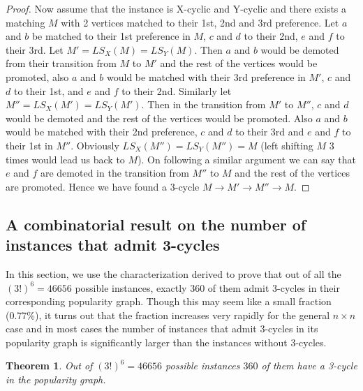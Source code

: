 \documentclass[a4paper,10pt]{article}
\theoremstyle{plain} %
\newtheorem{theorem}{Theorem}[section] %
\theoremstyle{plain} %
\begin{document}
\begin{proof}
    Now assume that the instance is X-cyclic and Y-cyclic and there exists a matching $M$ with 2 vertices matched to their 1st, 2nd and 3rd preference. Let $a$ and $b$ be matched to their 1st preference in $M$, $c$ and $d$ to their 2nd, $e$ and $f$ to their 3rd. Let $M' = LS_X(M) = LS_Y(M)$. Then $a$ and $b$ would be demoted from their transition from $M$ to $M'$ and the rest of the vertices would be promoted, also $a$ and $b$ would be matched with their 3rd preference in $M'$, $c$ and $d$ to their 1st, and $e$ and $f$ to their 2nd. Similarly let $M'' = LS_X(M') = LS_Y(M')$. Then in the transition from $M'$ to $M''$, $c$ and $d$ would be demoted and the rest of the vertices would be promoted. Also $a$ and $b$ would be matched with their 2nd preference, $c$ and $d$ to their 3rd and $e$ and $f$ to their 1st in $M''$. Obviously $LS_X(M'') = LS_Y(M'') = M$ (left shifting $M$ 3 times would lead us back to $M$). On following a similar argument we can say that $e$ and $f$ are demoted in the transition from $M''$ to $M$ and the rest of the vertices are promoted. Hence we have found a 3-cycle $M \rightarrow M' \rightarrow M'' \rightarrow M$.
\end{proof}

\subsection{A combinatorial result on the number of instances that admit 3-cycles}
In this section, we use the characterization derived to prove that out of all the $(3!)^6 = 46656$ possible instances, exactly 360 of them admit 3-cycles in their corresponding popularity graph. Though this may seem like a small fraction (0.77\%), it turns out that the fraction increases very rapidly for the general $n \times n$ case and in most cases the number of instances that admit 3-cycles in its popularity graph is significantly larger than the instances without 3-cycles.

\begin{theorem}
    Out of $(3!)^6 = 46656$ possible instances $360$ of them have a 3-cycle in the popularity graph.
\end{theorem}
\end{document}
